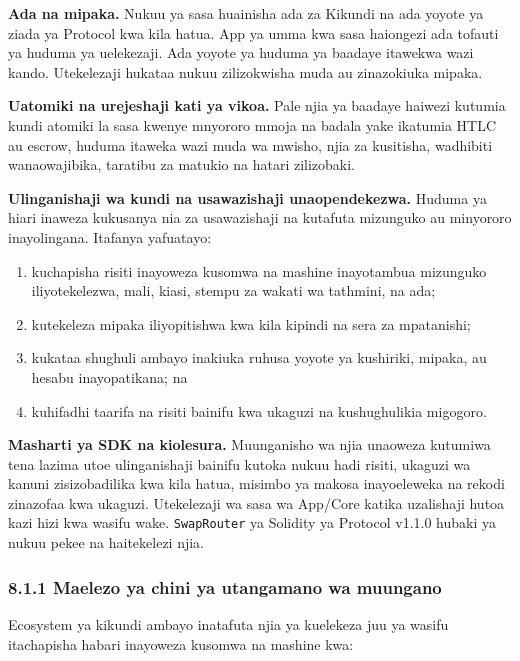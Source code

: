 \documentclass[11pt]{article}
\begin{document}
\textbf{Ada na mipaka.} Nukuu ya sasa huainisha ada za Kikundi na ada yoyote ya ziada ya Protocol kwa kila hatua. App ya umma kwa sasa haiongezi ada tofauti ya huduma ya uelekezaji. Ada yoyote ya huduma ya baadaye itawekwa wazi kando. Utekelezaji hukataa nukuu zilizokwisha muda au zinazokiuka mipaka.

\textbf{Uatomiki na urejeshaji kati ya vikoa.} Pale njia ya baadaye haiwezi kutumia kundi atomiki la sasa kwenye mnyororo mmoja na badala yake ikatumia HTLC au escrow, huduma itaweka wazi muda wa mwisho, njia za kusitisha, wadhibiti wanaowajibika, taratibu za matukio na hatari zilizobaki.

\textbf{Ulinganishaji wa kundi na usawazishaji unaopendekezwa.} Huduma ya hiari inaweza kukusanya nia za usawazishaji na kutafuta mizunguko au minyororo inayolingana. Itafanya yafuatayo:

\begin{enumerate}[leftmargin=*]
\item kuchapisha risiti inayoweza kusomwa na mashine inayotambua mizunguko iliyotekelezwa, mali, kiasi, stempu za wakati wa tathmini, na ada;
\item kutekeleza mipaka iliyopitishwa kwa kila kipindi na sera za mpatanishi;
\item kukataa shughuli ambayo inakiuka ruhusa yoyote ya kushiriki, mipaka, au hesabu inayopatikana; na
\item kuhifadhi taarifa na risiti bainifu kwa ukaguzi na kushughulikia migogoro.
\end{enumerate}
\textbf{Masharti ya SDK na kiolesura.} Muunganisho wa njia unaoweza kutumiwa tena lazima utoe ulinganishaji bainifu kutoka nukuu hadi risiti, ukaguzi wa kanuni zisizobadilika kwa kila hatua, misimbo ya makosa inayoeleweka na rekodi zinazofaa kwa ukaguzi. Utekelezaji wa sasa wa App/Core katika uzalishaji hutoa kazi hizi kwa wasifu wake. \texttt{SwapRouter} ya Solidity ya Protocol v1.1.0 hubaki ya nukuu pekee na haitekelezi njia.

\subsubsection*{8.1.1 Maelezo ya chini ya utangamano wa muungano}

Ecosystem ya kikundi ambayo inatafuta njia ya kuelekeza juu ya wasifu itachapisha habari inayoweza kusomwa na mashine kwa:
\end{document}
